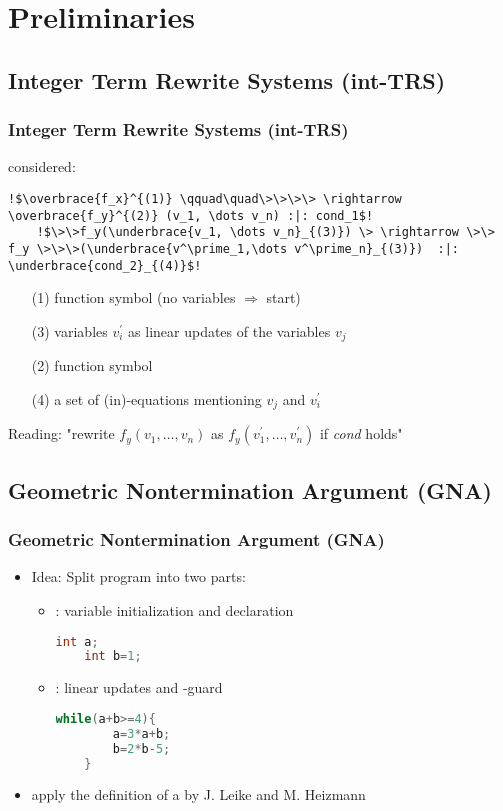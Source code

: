 \section{Preliminaries}

\subsection{Integer Term Rewrite Systems (int-TRS) }
\frame{\tableofcontents[currentsection]}
\begin{frame}[fragile] %
	\frametitle{Integer Term Rewrite Systems (int-TRS)}
	\its considered:
	\begin{lstlisting}[escapechar=!]
	!$\overbrace{f_x}^{(1)} \qquad\quad\>\>\>\> \rightarrow \overbrace{f_y}^{(2)} (v_1, \dots v_n) :|: cond_1$!
	!$\>\>f_y(\underbrace{v_1, \dots v_n}_{(3)}) \> \rightarrow \>\> f_y \>\>\>(\underbrace{v^\prime_1,\dots v^\prime_n}_{(3)})  :|: \underbrace{cond_2}_{(4)}$!
	\end{lstlisting}
	
	\begin{enumerate}
		\item[(1)] function symbol (no variables $\Rightarrow$ start)
		\item[(3)] variables $v^\prime_i$ as linear updates of the variables $v_j$
			\item[(2)] function symbol
			\item[(4)] a set of (in)-equations mentioning $v_j$ and $v^\prime_i$
	\end{enumerate}

	Reading: "rewrite $f_y(v_1,\dots,v_n)$ as $f_y(v^\prime_1,\dots,v^\prime_n)$ if \textit{cond} holds"
\end{frame}

\subsection{Geometric Nontermination Argument (GNA)}
\begin{frame}[fragile]
	\frametitle{Geometric Nontermination Argument (GNA)}
	\begin{itemize}
		\item Idea: Split program into two parts:
			\begin{itemize}
				\item \stem: variable initialization and declaration
					\begin{lstlisting}[language = java]
	int a;
	int b=1;
					\end{lstlisting}
				\item \loopt: linear updates and -guard
				\begin{lstlisting}[language = java]
	while(a+b>=4){
		a=3*a+b;
		b=2*b-5;
	}
				\end{lstlisting}
			\end{itemize}
		\item apply the definition of a \gna by J. Leike and M. Heizmann 
	\end{itemize}
\end{frame}


